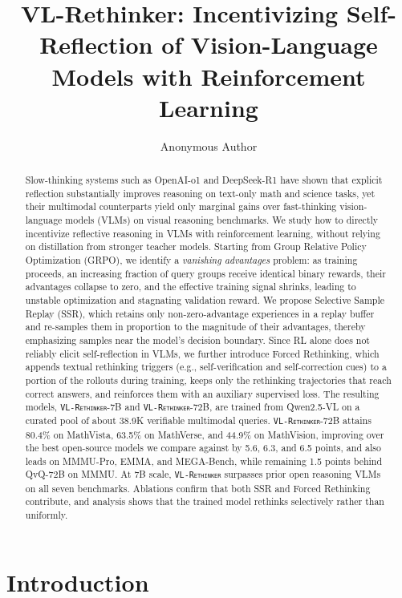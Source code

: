 \documentclass{article}
\title{VL-Rethinker: Incentivizing Self-Reflection of Vision-Language Models with Reinforcement Learning}
\author{Anonymous Author}
\newcommand{\model}{\texttt{\textsc{VL-Rethinker}}\xspace}
\begin{document}
\maketitle

\begin{abstract}
Slow-thinking systems such as OpenAI-o1 and DeepSeek-R1 have shown that explicit reflection substantially improves reasoning on text-only math and science tasks, yet their multimodal counterparts yield only marginal gains over fast-thinking vision-language models (VLMs) on visual reasoning benchmarks. We study how to directly incentivize reflective reasoning in VLMs with reinforcement learning, without relying on distillation from stronger teacher models. Starting from Group Relative Policy Optimization (GRPO), we identify a \emph{vanishing advantages} problem: as training proceeds, an increasing fraction of query groups receive identical binary rewards, their advantages collapse to zero, and the effective training signal shrinks, leading to unstable optimization and stagnating validation reward. We propose Selective Sample Replay (SSR), which retains only non-zero-advantage experiences in a replay buffer and re-samples them in proportion to the magnitude of their advantages, thereby emphasizing samples near the model's decision boundary. Since RL alone does not reliably elicit self-reflection in VLMs, we further introduce Forced Rethinking, which appends textual rethinking triggers (e.g., self-verification and self-correction cues) to a portion of the rollouts during training, keeps only the rethinking trajectories that reach correct answers, and reinforces them with an auxiliary supervised loss. The resulting models, \model-7B and \model-72B, are trained from Qwen2.5-VL on a curated pool of about 38.9K verifiable multimodal queries. \model-72B attains 80.4\% on MathVista, 63.5\% on MathVerse, and 44.9\% on MathVision, improving over the best open-source models we compare against by 5.6, 6.3, and 6.5 points, and also leads on MMMU-Pro, EMMA, and MEGA-Bench, while remaining 1.5 points behind QvQ-72B on MMMU. At 7B scale, \model surpasses prior open reasoning VLMs on all seven benchmarks. Ablations confirm that both SSR and Forced Rethinking contribute, and analysis shows that the trained model rethinks selectively rather than uniformly.
\end{abstract}

\section{Introduction}
\label{sec:intro}
\end{document}
